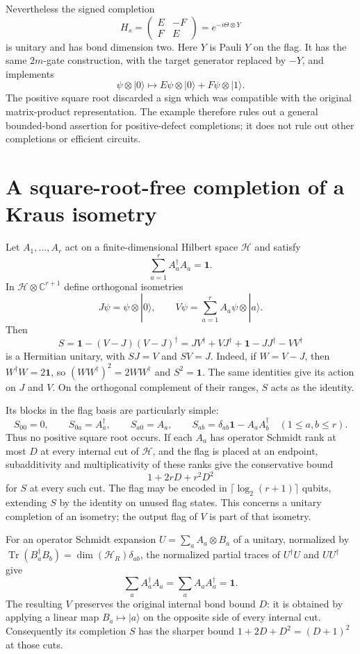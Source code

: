 \documentclass[11pt]{article}
\newcommand{\id}{\mathbf 1}
\begin{document}
Nevertheless the signed completion
\[
 H_s=\begin{pmatrix}E&-F\\F&E\end{pmatrix}
       =e^{-i\Theta\otimes Y}
\]
is unitary and has bond dimension two. Here $Y$ is Pauli $Y$ on the
flag. It has the same $2m$-gate construction, with the target generator
replaced by $-Y$, and implements
\[
 \psi\otimes|0\rangle\longmapsto
 E\psi\otimes|0\rangle+F\psi\otimes|1\rangle.
\]
The positive square root discarded a sign which was compatible with
the original matrix-product representation. The example therefore
rules out a general bounded-bond assertion for positive-defect
completions; it does not rule out other completions or efficient
circuits.

\section{A square-root-free completion of a Kraus isometry}

Let $A_1,\ldots,A_r$ act on a finite-dimensional Hilbert space
$\mathcal H$ and satisfy
\[
 \sum_{a=1}^r A_a^\dagger A_a=\id.
\]
In $\mathcal H\otimes\mathbb C^{r+1}$ define orthogonal isometries
\[
 J\psi=\psi\otimes|0\rangle,\qquad
 V\psi=\sum_{a=1}^r A_a\psi\otimes|a\rangle.
\]
Then
\[
 S=\id-(V-J)(V-J)^\dagger
   =JV^\dagger+VJ^\dagger+\id-JJ^\dagger-VV^\dagger
\]
is a Hermitian unitary, with $SJ=V$ and $SV=J$. Indeed, if $W=V-J$,
then $W^\dagger W=2\id$, so $(WW^\dagger)^2=2WW^\dagger$ and
$S^2=\id$. The same identities give its action on $J$ and $V$.
On the orthogonal complement of their ranges, $S$ acts as the identity.

Its blocks in the flag basis are particularly simple:
\[
 S_{00}=0,\qquad S_{0a}=A_a^\dagger,\qquad S_{a0}=A_a,
 \qquad S_{ab}=\delta_{ab}\id-A_aA_b^\dagger
 \quad(1\leq a,b\leq r).
\]
Thus no positive square root occurs. If each $A_a$ has operator Schmidt
rank at most $D$ at every internal cut of $\mathcal H$, and the flag
is placed at an endpoint, subadditivity and multiplicativity of these
ranks give the conservative bound
\[
 1+2rD+r^2D^2
\]
for $S$ at every such cut. The flag may be encoded in
$\lceil\log_2(r+1)\rceil$ qubits, extending $S$ by the identity on
unused flag states. This concerns a unitary completion of an isometry;
the output flag of $V$ is part of that isometry.

For an operator Schmidt expansion
$U=\sum_a A_a\otimes B_a$ of a unitary, normalized by
$\operatorname{Tr}(B_a^\dagger B_b)=\dim(\mathcal H_R)\delta_{ab}$,
the normalized partial traces of $U^\dagger U$ and $UU^\dagger$ give
\[
 \sum_a A_a^\dagger A_a=\sum_a A_aA_a^\dagger=\id.
\]
The resulting $V$ preserves the original internal bond bound $D$:
it is obtained by applying a linear map $B_a\mapsto|a\rangle$ on
the opposite side of every internal cut. Consequently its completion
$S$ has the sharper bound $1+2D+D^2=(D+1)^2$ at those cuts.
\end{document}
